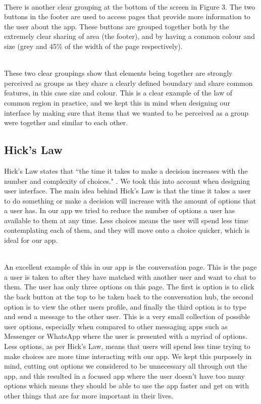 \documentclass[a4paper, 11pt]{article}
\begin{document}
~\\
There is another clear grouping at the bottom of the screen in Figure 3. The two buttons in the footer are used to access pages that provide more information to the user about the app. These buttons are grouped together both by the extremely clear sharing of area (the footer), and by having a common colour and size (grey and 45\% of the width of the page respectively).

~\\
These two clear groupings show that elements being together are strongly perceived as groups as they share a clearly defined boundary and share common features, in this case size and colour. This is a clear example of the law of common region in practice, and we kept this in mind when designing our interface by making sure that items that we wanted to be perceived as a group were together and similar to each other.  


\subsection{Hick's Law}
Hick's Law states that ``the time it takes to make a decision increases with the number and complexity of choices." \cite{hicks}. We took this into account when designing user interface. The main idea behind Hick's Law is that the time it takes a user to do something or make a decision will increase with the amount of options that a user has. In our app we tried to reduce the number of options a user has available to them at any time. Less choices means the user will spend less time contemplating each of them, and they will move onto a choice quicker, which is ideal for our app.

~\\
An excellent example of this in our app is the conversation page. This is the page a user is taken to after they have matched with another user and want to chat to them. The user has only three options on this page. The first is option is to click the back button at the top to be taken back to the conversation hub, the second option is to view the other users profile, and finally the third option is to type and send a message to the other user. This is a very small collection of possible user options, especially when compared to other messaging apps such as Messenger or WhatsApp where the user is presented with a myriad of options. Less options, as per Hick's Law, means that users will spend less time trying to make choices are more time interacting with our app. We kept this purposely in mind, cutting out options we considered to be unnecessary all through out the app, and this resulted in a focused app where the user doesn't have too many options which means they should be able to use the app faster and get on with other things that are far more important in their lives.
\end{document}
